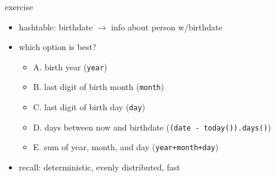 \begin{frame}[fragile,label=exercise]{exercise}
    \lstset{language=C++}
    \begin{itemize}
    \item hashtable: birthdate $\rightarrow$ info about person w/birthdate
    \item which option is best?
    \begin{itemize}
    \item A. birth year (\lstinline|year|)
    \item B. last digit of birth month (\lstinline|month|)
    \item C. last digit of birth day (\lstinline|day|)
    \item D. days between now and birthdate (\lstinline|(date - today()).days()|)
    \item E. sum of year, month, and day (\lstinline|year+month+day|)
    \end{itemize}
    \item recall: deterministic, evenly distributed, fast
    \end{itemize}
\end{frame}
